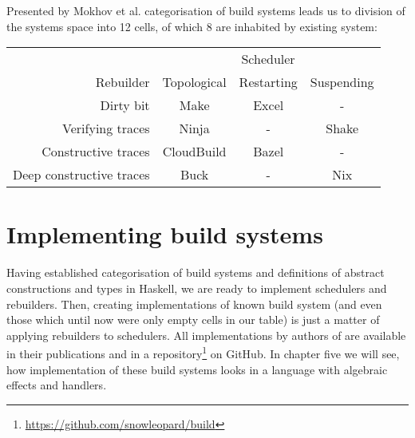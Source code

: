 Presented by Mokhov et al. categorisation of build systems leads us to division of the systems space into 12 cells, of which 8 are inhabited by existing system:

\begin{tabular}{r | c c c}
\hline
                         & \multicolumn{3}{c}{Scheduler} \\
Rebuilder                & Topological & Restarting & Suspending \\
\hline
Dirty bit                & Make        & Excel      & - \\
Verifying traces         & Ninja       & -          & Shake \\
Constructive traces      & CloudBuild  & Bazel      & -\\
Deep constructive traces & Buck        & -          & Nix \\
\hline
\end{tabular}

\section{Implementing build systems}

Having established categorisation of build systems and definitions of abstract constructions and types in Haskell, we are ready to implement schedulers and rebuilders. Then, creating implementations of known build system (and even those which until now were only empty cells in our table) is just a matter of applying rebuilders to schedulers. All implementations by authors of \BSaLC{} are available in their publications \cite{mokhov2018build, mokhov2020build} and in a repository\footnote{\url{https://github.com/snowleopard/build}} on GitHub. In chapter five we will see, how implementation of these build systems looks in a language with algebraic effects and handlers.

\undef\inl

